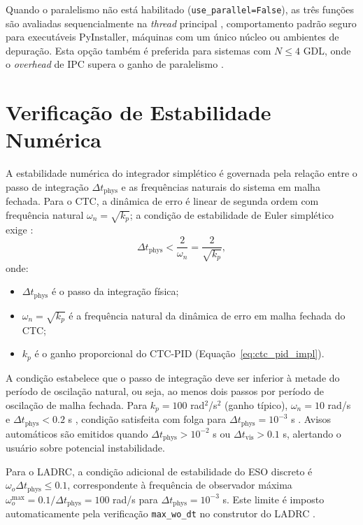 Quando o paralelismo não está habilitado (\texttt{use\_parallel=False}), as três funções são avaliadas sequencialmente na \textit{thread} principal , comportamento padrão seguro para executáveis PyInstaller, máquinas com um único núcleo ou ambientes de depuração. Esta opção também é preferida para sistemas com $N \leq 4$ GDL, onde o \textit{overhead} de IPC supera o ganho de paralelismo \cite{beazley2010understanding}.

\section{Verificação de Estabilidade Numérica}
\label{sec:estabilidade_num}

A estabilidade numérica do integrador simplético é governada pela relação entre o passo de integração $\Delta t_{\text{phys}}$ e as frequências naturais do sistema em malha fechada. Para o CTC, a dinâmica de erro é linear de segunda ordem com frequência natural $\omega_n = \sqrt{k_p}$; a condição de estabilidade de Euler simplético exige \cite{leimkuhler2004simulating}:
\begin{equation}
    \Delta t_{\text{phys}} < \frac{2}{\omega_n} = \frac{2}{\sqrt{k_p}},
    \label{eq:stability_condition}
\end{equation}
onde:
\begin{itemize}
    \item $\Delta t_{\text{phys}}$ é o passo da integração física;
    \item $\omega_n = \sqrt{k_p}$ é a frequência natural da dinâmica de erro em malha fechada do CTC;
    \item $k_p$ é o ganho proporcional do CTC-PID (Equação~\eqref{eq:ctc_pid_impl}).
\end{itemize}
A condição estabelece que o passo de integração deve ser inferior à metade do período de oscilação natural, ou seja, ao menos dois passos por período de oscilação de malha fechada. Para $k_p = 100$ rad$^2$/s$^2$ (ganho típico), $\omega_n = 10$ rad/s e $\Delta t_{\text{phys}} < 0.2$ s , condição satisfeita com folga para $\Delta t_{\text{phys}} = 10^{-3}$ s \cite{hairer2006geometric}. Avisos automáticos são emitidos quando $\Delta t_{\text{phys}} > 10^{-2}$ s ou $\Delta t_{\text{vis}} > 0.1$ s, alertando o usuário sobre potencial instabilidade.

Para o LADRC, a condição adicional de estabilidade do ESO discreto é $\omega_o \Delta t_{\text{phys}} \leq 0.1$, correspondente à frequência de observador máxima $\omega_o^{\max} = 0.1/\Delta t_{\text{phys}} = 100$ rad/s para $\Delta t_{\text{phys}} = 10^{-3}$ s. Este limite é imposto automaticamente pela verificação \texttt{max\_wo\_dt} no construtor do LADRC \cite{zheng2010practical}.

